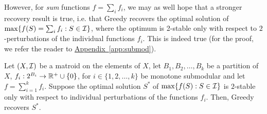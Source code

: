 However, for \textit{sum} functions $f=\sum_if_i$, we may as well hope that a stronger recovery result is true, i.e. that Greedy recovers the optimal solution of $\max\{f(S)=\sum_if_i: S\in \mathcal{I}\}$, where the optimum is 2-stable only with respect to $2$-perturbations of the individual functions $f_i$. This is indeed true (for the proof, we refer the reader to \hyperref[app:submod]{Appendix~\ref{app:submod}}).

\begin{theorem} \label{th:submod}
Let $(X,\mathcal{I})$ be a matroid on the elements of $X$, let $B_1,B_2,\dots,B_k$ be a partition of $X$, $f_i: 2^{B_i}\to \mathbb{R}^+\cup\{0\}$, for $i\in \{1,2,\dots,k\}$ be monotone submodular and let $f=\sum_{i=1}^kf_i$. Suppose the optimal solution $S^*$ of $\max\{f(S): S\in \mathcal{I}\}$ is $2$-stable only with respect to individual perturbations of the functions $f_i$. Then, Greedy recovers $S^*$.
\end{theorem}


























